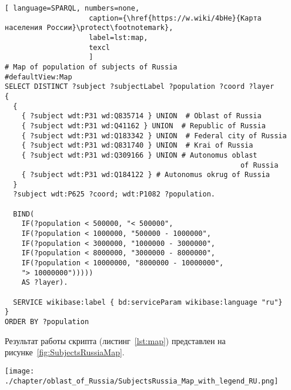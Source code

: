 \begin{lstlisting}[ language=SPARQL, numbers=none,
                    caption={\href{https://w.wiki/4bHe}{Карта населения России}\protect\footnotemark},
                    label=lst:map,
                    texcl 
                    ]
# Map of population of subjects of Russia
#defaultView:Map
SELECT DISTINCT ?subject ?subjectLabel ?population ?coord ?layer
{
  {
    { ?subject wdt:P31 wd:Q835714 } UNION  # Oblast of Russia
    { ?subject wdt:P31 wd:Q41162 } UNION  # Republic of Russia
    { ?subject wdt:P31 wd:Q183342 } UNION  # Federal city of Russia
    { ?subject wdt:P31 wd:Q831740 } UNION  # Krai of Russia
    { ?subject wdt:P31 wd:Q309166 } UNION # Autonomus oblast 
                                                        of Russia
    { ?subject wdt:P31 wd:Q184122 } # Autonomus okrug of Russia
  }   
  ?subject wdt:P625 ?coord; wdt:P1082 ?population.
  
  BIND(
    IF(?population < 500000, "< 500000",
    IF(?population < 1000000, "500000 - 1000000",
    IF(?population < 3000000, "1000000 - 3000000",
    IF(?population < 8000000, "3000000 - 8000000",
    IF(?population < 10000000, "8000000 - 10000000",
    "> 10000000")))))
    AS ?layer).
  
  SERVICE wikibase:label { bd:serviceParam wikibase:language "ru"}
}
ORDER BY ?population
\end{lstlisting}%

Результат работы скрипта (листинг~\protect\ref{lst:map}) представлен на рисунке~\ref{fig:SubjectsRussiaMap}.

\begin{fullwidth}
\begin{figure*}[h]
	\texttt{[image: ./chapter/oblast\_of\_Russia/SubjectsRussia\_Map\_with\_legend\_RU.png]}
	\caption[Карта численности населения по субъектам России, 2021.]{Карта численности населения по субъектам России, 2021. Субъекты разделёны на шесть групп по количеству населения и отмечены разными цветами в зависимости от группы, в которую субъект входит. Карта построена на основе данных, полученных с помощью запроса~\protect\ref{lst:map}.}%
      \label{fig:SubjectsRussiaMap}%
\end{figure*} 
\end{fullwidth}


